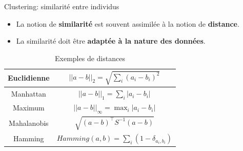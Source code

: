 \documentclass[hyperref={pdfpagelabels=false}]{beamer}
\begin{document}
    \begin{frame}{Clustering: similarité entre individus}
        \begin{itemize}
            \item La notion de \textbf{similarité} est souvent assimilée à la 
                notion de \textbf{distance}.
            \item La similarité doit être \textbf{adaptée à la nature des 
                données}.
        \end{itemize}

        \begin{table}[!h]
            \centering
               \begin{tabular}{cc}
               \hline
               Euclidienne & $ ||a - b ||_2  = \sqrt{ \sum_{i} (a_i - b_i)^2} $    \\	
               \hline
               Manhattan & $ ||a - b ||_1  = \sum_{i} |a_i - b_i|$    \\	
               \hline
               Maximum & $ ||a - b ||_{\infty}  = \mathop\mathrm{max}_{i} |a_i - b_i|$    \\	
               \hline 
               Mahalanobis & $ \sqrt{(a-b)^\top S^{-1}(a-b)}$    \\	
               \hline  
               Hamming & $ Hamming(a,b) = \sum_i  (1- \delta_{a_i,b_i}) $   \\	
               \hline           
               \end{tabular}
               \caption{Exemples de distances}
           \end{table}
    \end{frame}
\end{document}
